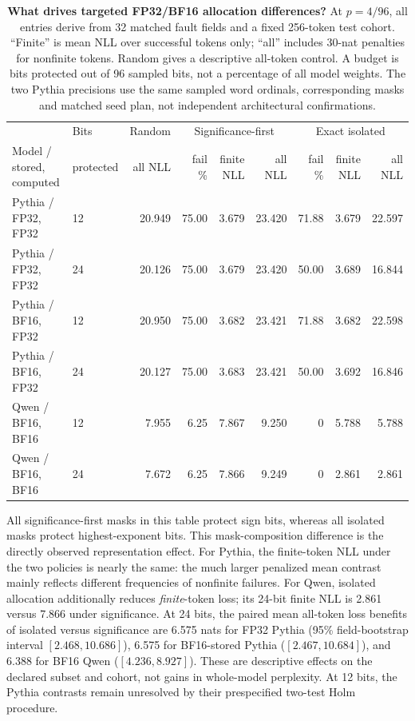 \begin{table}[t]\centering\scriptsize
\caption{\textbf{What drives targeted FP32/BF16 allocation differences?}
At $p=4/96$, all entries derive from 32 matched fault fields and a fixed
256-token test cohort. ``Finite'' is mean NLL over successful tokens only;
``all'' includes 30-nat penalties for nonfinite tokens. Random gives a
descriptive all-token control. A budget is bits protected out of 96 sampled
bits, not a percentage of all model weights. The two Pythia precisions use
the same sampled word ordinals, corresponding masks and matched seed plan,
not independent architectural confirmations.}
\label{tab:lmtarget}
\begin{tabular}{llrrrrrrr}\toprule
 & Bits & Random & \multicolumn{3}{c}{Significance-first} & \multicolumn{3}{c}{Exact isolated}\\
Model / stored, computed & protected & all NLL & fail \% & finite NLL & all NLL & fail \% & finite NLL & all NLL\\\midrule
Pythia / FP32, FP32 & 12 & 20.949 & 75.00 & 3.679 & 23.420 & 71.88 & 3.679 & 22.597\\
Pythia / FP32, FP32 & 24 & 20.126 & 75.00 & 3.679 & 23.420 & 50.00 & 3.689 & 16.844\\
Pythia / BF16, FP32 & 12 & 20.950 & 75.00 & 3.682 & 23.421 & 71.88 & 3.682 & 22.598\\
Pythia / BF16, FP32 & 24 & 20.127 & 75.00 & 3.683 & 23.421 & 50.00 & 3.692 & 16.846\\
Qwen / BF16, BF16 & 12 & 7.955 & 6.25 & 7.867 & 9.250 & 0 & 5.788 & 5.788\\
Qwen / BF16, BF16 & 24 & 7.672 & 6.25 & 7.866 & 9.249 & 0 & 2.861 & 2.861\\
\bottomrule\end{tabular}
\end{table}

All significance-first masks in this table protect sign bits, whereas all
isolated masks protect highest-exponent bits. This mask-composition difference
is the directly observed representation effect. For Pythia, the finite-token
NLL under the two policies is nearly the same: the much larger penalized mean
contrast mainly reflects different frequencies of nonfinite failures. For
Qwen, isolated allocation additionally reduces \emph{finite}-token loss;
its 24-bit finite NLL is 2.861 versus 7.866 under significance. At 24 bits,
the paired mean all-token loss benefits of isolated versus significance are
6.575 nats for FP32 Pythia (95\% field-bootstrap interval $[2.468,10.686]$),
6.575 for BF16-stored Pythia ($[2.467,10.684]$), and 6.388 for BF16 Qwen
($[4.236,8.927]$). These are descriptive effects on the declared subset and
cohort, not gains in whole-model perplexity. At 12 bits, the Pythia contrasts
remain unresolved by their prespecified two-test Holm procedure.

